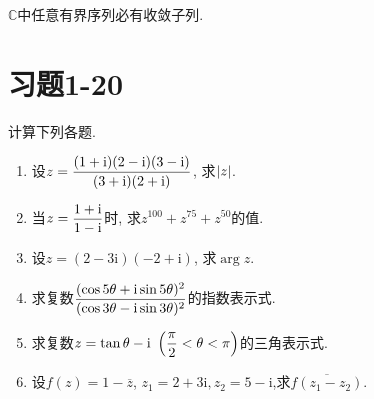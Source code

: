 	\begin{theorem}
		$\mathbb{C}$中任意有界序列必有收敛子列.
	\end{theorem}

\section{习题1-20}


\begin{yyEx}
	计算下列各题.
	\begin{enumerate}
		\item 设$z = \begin{lgathered}\frac{(1+\mathrm{i})(2-\mathrm{i})(3-\mathrm{i})}{(3+\mathrm{i})(2+\mathrm{i})}\end{lgathered}$, 求$\lvert z\rvert$.
		\item 当$z = \begin{lgathered}\frac{1+\mathrm{i}}{1-\mathrm{i}}\end{lgathered}$时, 求$z^{100}+z^{75}+z^{50}$的值.
		\item 设$z = (2-3\mathrm{i})(-2+\mathrm{i})$, 求$\arg z$.
		\item 求复数$\begin{lgathered}\frac{(\cos 5\theta + \mathrm{i}\sin 5\theta)^2}{(\cos 3\theta - \mathrm{i}\sin 3\theta)^2}\end{lgathered}$的指数表示式.
		\item 求复数$\begin{lgathered}z = \tan\theta - \mathrm{i}~\left(\frac{\pi}{2}<\theta<\pi\right)\end{lgathered}$的三角表示式.
		\item 设$f(z) = 1-\overline{z}$, $z_1 = 2+3\mathrm{i},z_2 = 5-\mathrm{i}$,求$\overline{f(z_1-z_2)}$.
	\end{enumerate}
\end{yyEx}

